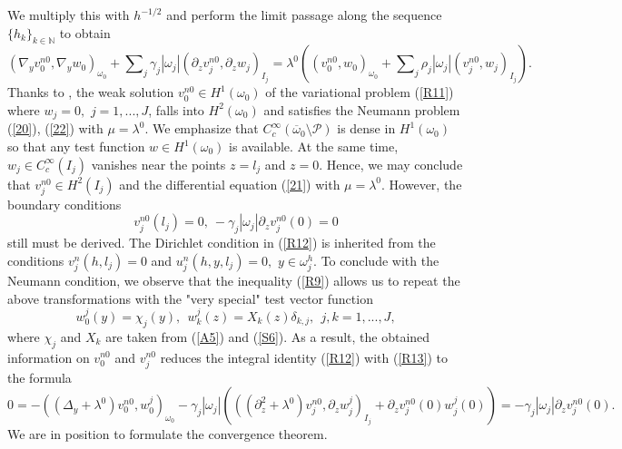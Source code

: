 \documentclass[11pt]{article}%
\numberwithin{equation}{section}
\begin{document}
We multiply this with $h^{-1/2}$ and perform the limit passage along the
sequence $\{h_{k}\}_{k\in\mathbb{N}}$ to obtain%
\begin{equation}
(\nabla_{y}v_{0}^{n0},\nabla_{y}w_{0})_{\omega_{0}}+%
{\textstyle\sum\nolimits_{j}}
\gamma_{j}|\omega_{j}|(\partial_{z}v_{j}^{n0},\partial_{z}w_{j})_{I_{j}%
}=\lambda^{0}\left(  (v_{0}^{n0},w_{0})_{\omega_{0}}+%
{\textstyle\sum\nolimits_{j}}
\rho_{j}|\omega_{j}|(v_{j}^{n0},w_{j})_{I_{j}}\right)  . \label{R11}%
\end{equation}
Thanks to \cite[\S 9 Ch. 2]{LiMa}, the weak solution $v_{0}^{n0}\in
H^{1}(\omega_{0})$ of the variational problem (\ref{R11}) where $w_{j}=0,$
$j=1,...,J$, falls into $H^{2}(\omega_{0})$ and satisfies the Neumann problem
(\ref{20}), (\ref{22}) with $\mu=\lambda^{0}$. We emphasize that
$C_{c}^{\infty}(\overline{\omega}_{0}\setminus\mathcal{P})$ is dense in
$H^{1}(\omega_{0})$ so that any test function $w\in H^{1}(\omega_{0})$ is
available. At the same time, $w_{j}\in C_{c}^{\infty}(I_{j})$ vanishes near
the points $z=l_{j}$ and $z=0$. Hence, we may conclude that $v_{j}^{n0}\in
H^{2}(I_{j})$ and the differential equation (\ref{21}) with $\mu=\lambda^{0}$.
However, the boundary conditions%
\begin{equation}
v_{j}^{n0}(l_{j})=0,\ -\gamma_{j}|\omega_{j}|\partial_{z}v_{j}^{n0}(0)=0
\label{R12}%
\end{equation}
still must be derived. The Dirichlet condition in (\ref{R12}) is inherited
from the conditions $v_{j}^{n}(h,l_{j})=0$ and $u_{j}^{n}(h,y,l_{j})=0,$
$y\in\omega_{j}^{h}$. To conclude with the Neumann condition, we observe that
the inequality (\ref{R9}) allows us to repeat the above transformations with
the "very special" test vector function%
\begin{equation}
w_{0}^{j}(y)=\chi_{j}(y),\ \ w_{k}^{j}(z)=X_{k}(z)\delta_{k,j}%
,\ \ j,k=1,...,J, \label{R13}%
\end{equation}
where $\chi_{j}$ and $X_{k}$ are taken from (\ref{A5}) and (\ref{S6}). As a
result, the obtained information on $v_{0}^{n0}$ and $v_{j}^{n0}$ reduces the
integral identity (\ref{R12}) with (\ref{R13}) to the formula%
\[
0=-((\Delta_{y}+\lambda^{0})v_{0}^{n0},w_{0}^{j})_{\omega_{0}}-\gamma
_{j}|\omega_{j}|(((\partial_{z}^{2}+\lambda^{0})v_{j}^{n0},\partial_{z}%
w_{j}^{j})_{I_{j}}+\partial_{z}v_{j}^{n0}(0)w_{j}^{j}(0))=-\gamma_{j}%
|\omega_{j}|\partial_{z}v_{j}^{n0}(0).
\]
We are in position to formulate the convergence theorem.
\end{document}
